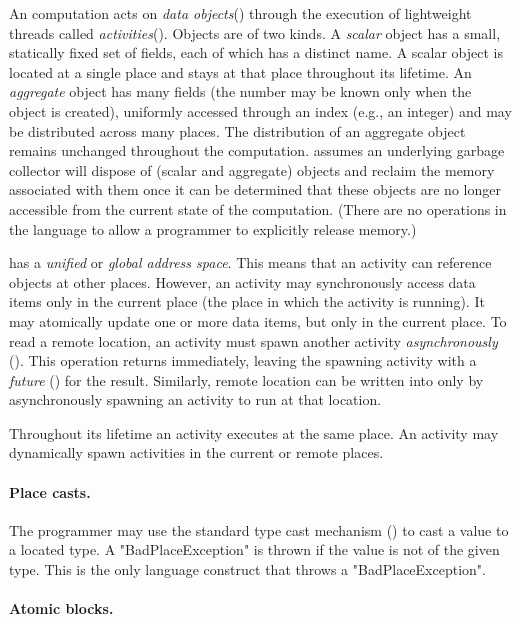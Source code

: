 An \Xten{} computation acts on \emph{data
objects}() through the execution of lightweight
threads called \emph{activities}().  Objects are
of two kinds. A \emph{scalar} object has a small, statically fixed set
of fields, each of which has a distinct name. A scalar object is
located at a single place and stays at that place throughout its
lifetime.  An \emph{aggregate} object has many fields (the number may
be known only when the object is created), uniformly accessed through
an index (e.g., an integer) and may be distributed across many
places. The distribution of an aggregate object remains unchanged
throughout the computation. \Xten{} assumes an underlying garbage
collector will dispose of (scalar and aggregate) objects and reclaim
the memory associated with them once it can be determined that these
objects are no longer accessible from the current state of the
computation. (There are no operations in the language to allow a
programmer to explicitly release memory.)

{}\Xten{} has a \emph{unified} or \emph{global address space}. This
means that an activity can reference objects at other places.
However, an activity may synchronously access data items only in the
current place (the place in which the activity is running). It may
atomically update one or more data items, but only in the current
place.  To read a remote location, an activity must spawn another
activity \emph{asynchronously} (). This
operation returns immediately, leaving the spawning activity with a
\emph{future} () for the result. Similarly, remote
location can be written into only by asynchronously spawning an
activity to run at that location.

Throughout its lifetime an activity executes at the same place. An
activity may dynamically spawn activities in the current or remote
places.

\paragraph{Place casts.}
The programmer may use the standard type cast mechanism
() to cast a value to a located type. A
\xcd"BadPlaceException" is thrown if the value is not of the given
type. This is the only language construct that throws a \xcd"BadPlaceException".

\paragraph{Atomic blocks.}

